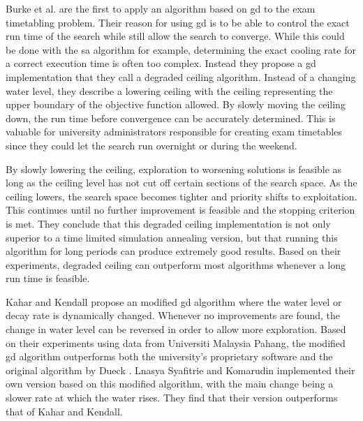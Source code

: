 Burke et al. \cite{burke2004GD} are the first to apply an algorithm based on \acrlong{gd} to the exam timetabling problem. Their reason for using \acrshort{gd} is to be able to control the exact run time of the search while still allow the search to converge. While this could be done with the \acrlong{sa} algorithm for example, determining the exact cooling rate for a correct execution time is often too complex. Instead they propose a \acrshort{gd} implementation that they call a degraded ceiling algorithm. Instead of a changing water level, they describe a lowering ceiling with the ceiling representing the upper boundary of the objective function allowed. By slowly moving the ceiling down, the run time before convergence can be accurately determined. This is valuable for university administrators responsible for creating exam timetables since they could let the search run overnight or during the weekend.

By slowly lowering the ceiling, exploration to worsening solutions is feasible as long as the ceiling level has not cut off certain sections of the search space. As the ceiling lowers, the search space becomes tighter and priority shifts to exploitation. This continues until no further improvement is feasible and the stopping criterion is met. They conclude that this degraded ceiling implementation is not only superior to a time limited simulation annealing version, but that running this algorithm for long periods can produce extremely good results. Based on their experiments, degraded ceiling can outperform most algorithms whenever a long run time is feasible.

Kahar and Kendall \cite{kahar2015} propose an modified \acrlong{gd} algorithm where the water level or decay rate is dynamically changed. Whenever no improvements are found, the change in water level can be reversed in order to allow more exploration. Based on their experiments using data from Universiti Malaysia Pahang, the modified \acrshort{gd} algorithm outperforms both the university's proprietary software and the original algorithm by Dueck \cite{dueck1993}. Lnasya Syafitrie and Komarudin \cite{Lnasya2022} implemented their own version based on this modified algorithm, with the main change being a slower rate at which the water rises. They find that their version outperforms that of Kahar and Kendall.


